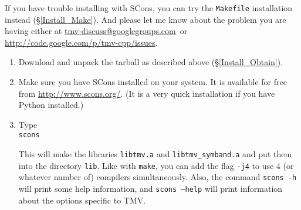\documentclass[twoside,letterpaper,11pt]{article}
\makeatletter
\newcommand{\mygroupx}{tmv-discuss@googlegroups.com}
\newcommand{\mygroup}{\href{mailto:\mygroupx}{\mygroupx}}
\newcommand{\myissuesx}{http://code.google.com/p/tmv-cpp/issues}
\newcommand{\myissues}{\url{\myissuesx}}
\makeatother
\begin{document}
If you have trouble installing with SCons, you can try the 
\texttt{Makefile} installation instead (\S\ref{Install_Make}).  And please let me know about 
the problem you are having either at \mygroup\ or \myissues.

\begin{enumerate}
\item Download and unpack the tarball as described above (\S\ref{Install_Obtain}).

\item Make sure you have SCons installed on your system.  
It is available for free from \url{http://www.scons.org/}.  (It is a
very quick installation if you have Python installed.)

\item Type \\
\texttt{scons}

This will make the libraries \texttt{libtmv.a} and \texttt{libtmv\_symband.a}
and put them into the directory \texttt{lib}.  Like with \texttt{make}, you can add
the flag \texttt{-j4} to use 4 (or whatever number of) compilers simultaneously.
Also, the command \texttt{scons -h} will print some help information, and \texttt{scons --help}
will print information about the options specific to TMV.


\end{enumerate}
\end{document}
